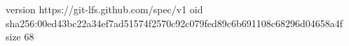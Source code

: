 version https://git-lfs.github.com/spec/v1
oid sha256:00ed43bc22a34ef7ad51574f2570c92c079fed89c6b691108c68296d04658a4f
size 68
